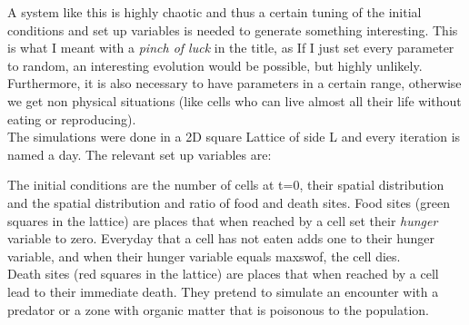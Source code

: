 \documentclass[a4paper,prd,twocolumn,nofootinbib,superscriptaddress,floatfix]{revtex4}
\begin{document}
A system like this is highly chaotic and thus a certain tuning of the initial conditions and set up variables is needed to generate something interesting. This is what I meant with a \textit{pinch of luck} in the title, as If I just set every parameter to random, an interesting evolution would be possible, but highly unlikely. Furthermore, it is also necessary to have parameters in a certain range, otherwise we get non physical  situations (like cells who can live almost all their life without eating or reproducing).\\
The simulations were done in a 2D square Lattice of side L and every iteration is named a day. The relevant set up variables are:\\

\begin{table}[H]
\begin{center}
\end{center}
\caption{Set Up Variables}
\label{fitcaractvi}
\end{table}

The initial conditions are the number of cells at t=0, their spatial distribution and the spatial distribution and ratio of food and death sites. Food sites (green squares in the lattice) are places that when reached by a cell set their \textit{hunger} variable to zero. Everyday that a cell has not eaten adds one to their hunger variable, and when their hunger variable equals maxswof, the cell dies.\\
Death sites (red squares in the lattice) are places that when reached by a cell lead to their immediate death. They pretend to simulate an encounter with a predator or a zone with organic matter that is poisonous to the population.
\end{document}
